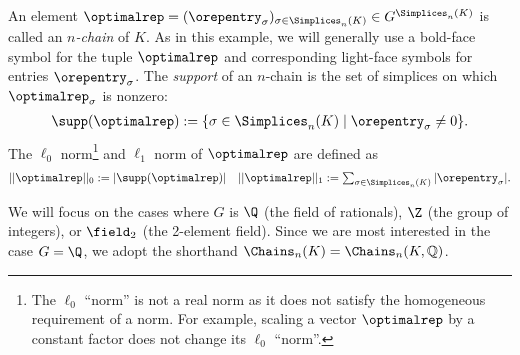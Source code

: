 An element $\optimalrep = (\orepentry_\sigma)_{\sigma \in \Simplices_n(K)} \in G^{\Simplices_n(K)}$ is called an \emph{$n$-chain} of $K$.   As  in this example, we will generally use a bold-face symbol for the tuple $\optimalrep$ and corresponding light-face symbols for entries $\orepentry_\sigma$.  The \emph{support} of an $n$-chain is the set of simplices on which $\optimalrep_\sigma$ is nonzero: %
%
    \begin{align*}
        \supp(\optimalrep)  :=\{ \sigma \in \Simplices_n(K) \mid \orepentry_\sigma \neq 0 \}.
    \end{align*}
%
The $\ell_0$ norm\footnote{The $\ell_0$ ``norm'' is not a real norm as it does not satisfy the homogeneous requirement of a norm. For example, scaling a vector $\optimalrep$ by a constant factor does not change its $\ell_0$ ``norm''.} and  $\ell_1$ norm  of $\optimalrep$ are defined as 
    \begin{align*}
        ||\optimalrep||_0 := |\supp(\optimalrep) |
        &&
        \textstyle
        ||\optimalrep||_1 := \sum_{ \sigma \in \Simplices_n(K)} | \orepentry_\sigma  |.
    \end{align*}

\begin{remark}
We will focus on the cases where $G$ is $\Q$ (the field of rationals), $\Z$ (the group of integers), or $\field_2$ (the 2-element field).  Since we are most interested in the case $G = \Q$, we adopt the shorthand $\Chains_n(K) = \Chains_n(K,\mathbb{Q})$. 
\end{remark}




 


